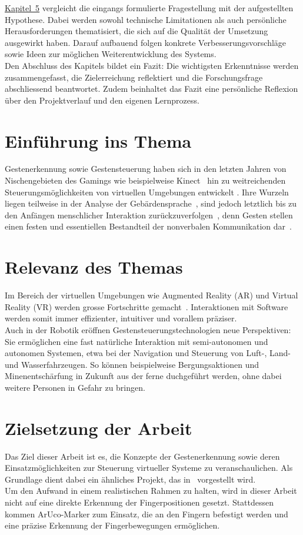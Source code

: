 \hyperref[sec:kapitel5]{Kapitel~5} vergleicht die eingangs formulierte Fragestellung mit der aufgestellten Hypothese.
Dabei werden sowohl technische Limitationen als auch persönliche Herausforderungen thematisiert, die sich auf die Qualität der Umsetzung ausgewirkt haben.
Darauf aufbauend folgen konkrete Verbesserungsvorschläge sowie Ideen zur möglichen Weiterentwicklung des Systems.\\[2pt]
Den Abschluss des Kapitels bildet ein Fazit: Die wichtigsten Erkenntnisse werden zusammengefasst, die Zielerreichung reflektiert und die Forschungsfrage abschliessend beantwortet.
Zudem beinhaltet das Fazit eine persönliche Reflexion über den Projektverlauf und den eigenen Lernprozess.

\section{Einführung ins Thema}
Gestenerkennung sowie Gestensteuerung haben sich in den letzten Jahren von Nischengebieten des Gamings wie beispielweise Kinect~\cite{Wiki:Kinect} hin zu weitreichenden Steuerungsmöglichkeiten von virtuellen Umgebungen entwickelt \cite{RG:GestureRecognition}.
Ihre Wurzeln liegen teilweise in der Analyse der Gebärdensprache~\cite{Wiki:Gestenerkennung}, sind jedoch letztlich bis zu den Anfängen menschlicher Interaktion zurückzuverfolgen~\cite{RG:Gesten}, denn Gesten stellen einen festen und essentiellen Bestandteil der nonverbalen Kommunikation dar~\cite[10]{Hobmair:Psy}.

\section{Relevanz des Themas}
Im Bereich der virtuellen Umgebungen wie Augmented Reality (AR) und Virtual Reality (VR) werden grosse Fortschritte gemacht~\cite{SD:VR}.
Interaktionen mit Software werden somit immer effizienter, intuitiver und vorallem präziser.\\[2pt]
Auch in der Robotik eröffnen Gestensteuerungstechnologien neue Perspektiven: Sie ermöglichen eine fast natürliche Interaktion mit semi-autonomen und autonomen Systemen, etwa bei der Navigation und Steuerung von Luft-, Land- und Wasserfahrzeugen.
So können beispielweise Bergungsaktionen und Minenentschärfung in Zukunft aus der ferne duchgeführt werden, ohne dabei weitere Personen in Gefahr zu bringen.

\section{Zielsetzung der Arbeit}
Das Ziel dieser Arbeit ist es, die Konzepte der Gestenerkennung sowie deren Einsatzmöglichkeiten zur Steuerung virtueller Systeme zu veranschaulichen.
Als Grundlage dient dabei ein ähnliches Projekt, das in~\cite{arxiv:OmniRace} vorgestellt wird.\\[2pt]
Um den Aufwand in einem realistischen Rahmen zu halten, wird in dieser Arbeit nicht auf eine direkte Erkennung der Fingerpositionen gesetzt.
Stattdessen kommen ArUco-Marker zum Einsatz, die an den Fingern befestigt werden und eine präzise Erkennung der Fingerbewegungen ermöglichen.

